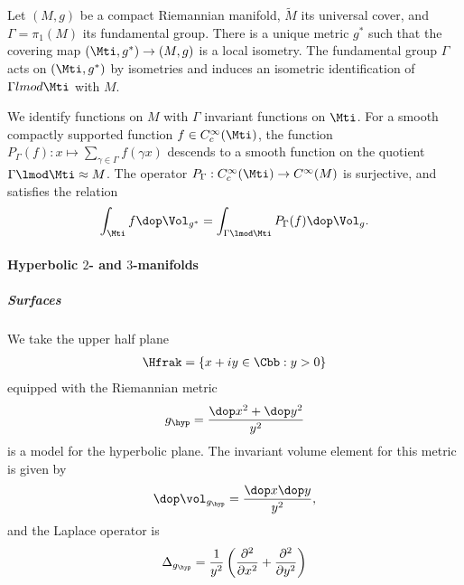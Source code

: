



Let $(M,g)$ be a compact Riemannian manifold, $\tilde{M}$ its universal cover, and $\Gamma =\pi_1(M)$ its fundamental group. There is a unique metric $g^*$ such that the covering map $(\Mti, g^*) \to (M,g)$ is a local isometry.  The fundamental group $\Gamma$ acts on $(\Mti,g^*)$ by isometries and induces an isometric identification of $\Gamma lmod \Mti$ with $M$.

We identify functions on $M$ with $\Gamma$ invariant functions on $\Mti$.  For a smooth compactly supported function $f \in C_c^\infty(\Mti)$, the function $P_\Gamma(f) : x \mapsto \sum_{\gamma \in \Gamma}f(\gamma x)$ descends to a smooth function on the quotient $\Gamma \lmod \Mti \approx M$. The operator $P_\Gamma:C_c^\infty(\Mti)\to C^\infty(M)$ is surjective, and satisfies the relation
\begin{align}\label{eq:average}
  \int_{\Mti} f \dop \Vol_{g^*}  = \int_{\Gamma \lmod \Mti} P_\Gamma (f) \dop \Vol_{g}.
\end{align}
























\paragraph{Hyperbolic $2$- and $3$-manifolds}

\subparagraph{Surfaces}
We take the upper half plane
\begin{align*}
  \Hfrak = \{ x+iy \in \Cbb : y >0\}
\end{align*}
equipped with the Riemannian metric
\begin{align*}
  g_\hyp = \frac{\dop x^2 +\dop y^2}{y^2}
\end{align*}
is a model for the hyperbolic plane. The invariant volume element for this metric is given by
\begin{align*}
  \dop \vol_{g_\hyp} = \frac{\dop x \dop y}{y^2},
\end{align*}
and the Laplace operator is
\begin{align*}
  \Delta_{g_\hyp} = \frac{1}{y^2}\left( \frac{\partial^2 }{\partial x^2}+ \frac{\partial^2 }{\partial y^2} \right)
\end{align*}


